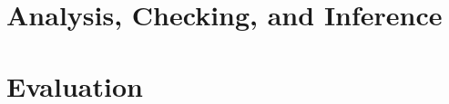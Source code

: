 \documentclass[acmlarge,review,anonymous]{acmart}\settopmatter{printfolios=true}
\theoremstyle{definition}
\theoremstyle{plain}
\theoremstyle{remark}
\begin{document}
  


\section{Analysis, Checking, and Inference}

\section{Evaluation}



\appendix

\end{document}

